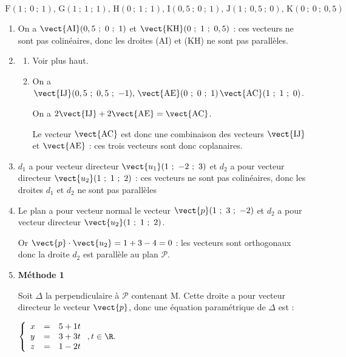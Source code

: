\[\, \text{F}(1~;~0~;~1),\, \text{G}(1~;~1~;~1),\, \text{H}(0~;~1~;~1),\, \text{I}(0,5~;~0~;~1),\, \text{J}(1~;~0,5~;~0),\, \text{K}(0~;~0~;~0,5)\]
\begin{enumerate}
\item 

On a $\vect{\text{AI}}(0,5~;~0~;~1)$ et $\vect{\text{KH}}(0~;~1~;~0,5)$ : ces vecteurs ne sont pas colinéaires, donc les droites (AI) et (KH) ne sont pas parallèles.


\item 
	\begin{enumerate}
		\item 
Voir plus haut.
		\item 
On a $\vect{\text{IJ}}(0,5~;~0,5~;~-1), \, \vect{\text{AE}}(0~;~0~;~1)\, \vect{\text{AC}}(1~;~1~;~0)$.

On a $2\vect{\text{IJ}} + 2\vect{\text{AE}} = \vect{\text{AC}}$.

Le vecteur $\vect{\text{AC}}$ est donc une combinaison des vecteurs $\vect{\text{IJ}}$ et $\vect{\text{AE}}$ : ces trois vecteurs sont donc coplanaires.
	\end{enumerate}

	














\item 

$d_1$ a pour vecteur directeur $\vect{u_1}(1~;~-2~;~3)$ et $d_2$ a pour vecteur directeur $\vect{u_2}(1~;~1~;~2)$ : ces vecteurs ne sont pas colinéaires, donc les droites $d_1$ et $d_2$ ne sont pas parallèles 
\item 

Le plan a pour vecteur normal le vecteur $\vect{p}(1~;~3~;~-2)$ et $d_2$ a pour vecteur directeur $\vect{u_2}(1~;~1~;~2)$.

Or $\vect{p} \cdot \vect{u_2} =  1 + 3 - 4 = 0$ : les vecteurs sont orthogonaux donc la droite $d_2$ est parallèle au plan $\mathcal P$.
\item 
\textbf{Méthode 1}

Soit $\Delta$ la perpendiculaire à $\mathcal P$ contenant M. Cette droite a pour vecteur directeur le vecteur $\vect{p}$, donc une équation paramétrique de $\Delta$ est :

$\left\{\begin{array}{l c l}
x	&=&5 + 1t\\
y 	&=&3 + 3t\\
z	&=&1 - 2t\\
\end{array}\right., t \in \R.$


\end{enumerate}
